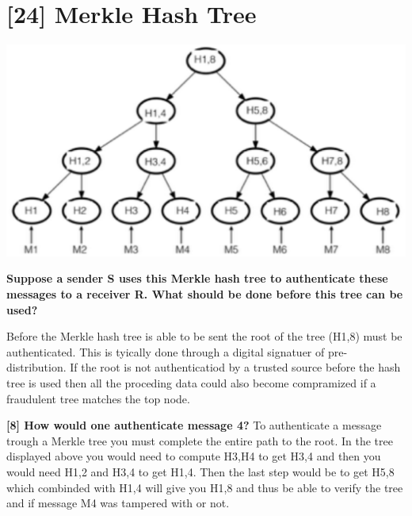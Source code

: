 \documentclass[letterpaper,11pt,notitlepage,fleqn]{article}
\begin{document}
\section{[24] Merkle Hash Tree}
\begin{center}
    \includegraphics[scale=0.5]{tree.eps}
\end{center}

\noindent \textbf{Suppose a sender S uses this Merkle hash tree to authenticate these messages to a receiver R. What should be done before this tree can be used?}

Before the Merkle hash tree is able to be sent the root of the tree (H1,8) must be authenticated. This is tyically done through a digital signatuer of pre-distribution. If the root is not authenticatiod by a trusted source before the hash tree is used then all the proceding data could also become compramized if a fraudulent tree matches the top node. 

\noindent \textbf{[8] How would one authenticate message 4?}
To authenticate a message trough a Merkle tree you must complete the entire path to the root. In the tree displayed above you would need to compute H3,H4 to get H3,4 and then you would need H1,2 and H3,4 to get H1,4. Then the last step would be to get H5,8 which combinded with H1,4 will give you H1,8 and thus be able to verify the tree and if message M4 was tampered with or not.
\end{document}
